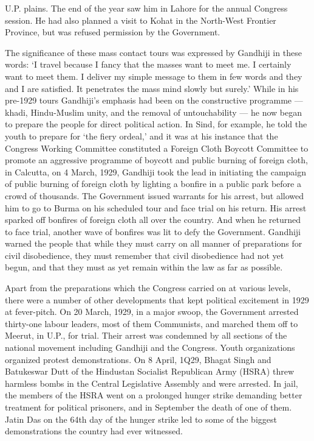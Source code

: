 U.P. plains. The end of the year saw him in Lahore for the annual Congress session. He had also planned a visit to Kohat in the North-West Frontier Province, but was refused permission by the Government. 

The significance of these mass contact tours was expressed by Gandhiji in these words: `I travel because I fancy that the masses want to meet me. I certainly want to meet them. I deliver my simple message to them in few words and they and I are satisfied. It penetrates the mass mind slowly but surely.' While in his pre-1929 tours Gandhiji's emphasis had been on the constructive programme --- khadi, Hindu-Muslim unity, and the removal of untouchability --- he now began to prepare the people for direct political action. In Sind, for example, he told the youth to prepare for `the fiery ordeal,' and it was at his instance that the Congress Working Committee constituted a Foreign Cloth Boycott Committee to promote an aggressive programme of boycott and public burning of foreign cloth, in Calcutta, on 4 March, 1929, Gandhiji took the lead in initiating the campaign of public burning of foreign cloth by lighting a bonfire in a public park before a crowd of thousands. The Government issued warrants for his arrest, but allowed him to go to Burma on his scheduled tour and face trial on his return. His arrest sparked off bonfires of foreign cloth all over the country. And when he returned to face trial, another wave of bonfires was lit to defy the Government. Gandhiji warned the people that while they must carry on all manner of preparations for civil disobedience, they must remember that civil disobedience had not yet begun, and that they must as yet remain within the law as far as possible. 

Apart from the preparations which the Congress carried on at various levels, there were a number of other developments that kept political excitement in 1929 at fever-pitch. On 20 March, 1929, in a major swoop, the Government arrested thirty-one labour leaders, most of them Communists, and marched them off to Meerut, in U.P., for trial. Their arrest was condemned by all sections of the national movement including Gandhiji and the Congress. Youth organizations organized protest demonstrations. On 8 April, 1Q29, Bhagat Singh and Batukeswar Dutt of the Hindustan Socialist Republican Army (HSRA) threw harmless bombs in the Central Legislative Assembly and were arrested. In jail, the members of the HSRA went on a prolonged hunger strike demanding better treatment for political prisoners, and in September the death of one of them. Jatin Das on the 64th day of the hunger strike led to some of the biggest demonstrations the country had ever witnessed. 

